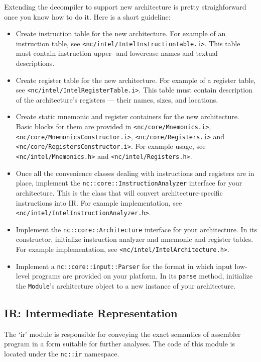 \documentclass[a4paper,12pt]{article}
\newcommand{\ident}[1]{\texttt{#1}}
\begin{document}
Extending the decompiler to support new architecture is pretty straighforward once you know how to do it. Here is a short guideline:
\begin{itemize}
\item Create instruction table for the new architecture. For example of an instruction table, see \verb|<nc/intel/IntelInstructionTable.i>|. 
	This table must contain instruction upper- and lowercase names and textual descriptions.
\item Create register table for the new architecture. For example of a register table, see \verb|<nc/intel/IntelRegisterTable.i>|. 
	This table must contain description of the architecture's registers --- their names, sizes, and locations.
\item Create static mnemonic and register containers for the new architecture. 
	Basic blocks for them are provided in \verb|<nc/core/Mnemonics.i>|, \verb|<nc/core/MnemonicsConstructor.i>|, \verb|<nc/core/Registers.i>| and \verb|<nc/core/RegistersConstructor.i>|.
	For example usage, see \verb|<nc/intel/Mnemonics.h>| and \verb|<nc/intel/Registers.h>|.
\item Once all the convenience classes dealing with instructions and registers are in place, implement the \ident{nc::core::InstructionAnalyzer} interface for your architecture.
	This is the class that will convert architecture-specific instructions into IR.
	For example implementation, see \verb|<nc/intel/IntelInstructionAnalyzer.h>|.
\item Implement the \ident{nc::core::Architecture} interface for your architecture. In its constructor, initialize instruction analyzer and mnemonic and register tables.
	For example implementation, see \verb|<nc/intel/IntelArchitecture.h>|.
\item Implement a \ident{nc::core::input::Parser} for the format in which input low-level programs are provided on your platform. 
	In its \ident{parse} method, initialize the \ident{Module}'s architecture object to a new instance of your architecture.
\end{itemize}


\subsection{IR: Intermediate Representation}

The `ir' module is responsible for conveying the exact semantics of assembler program in a form suitable for further analyses.
The code of this module is located under the \ident{nc::ir} namespace.
\end{document}
